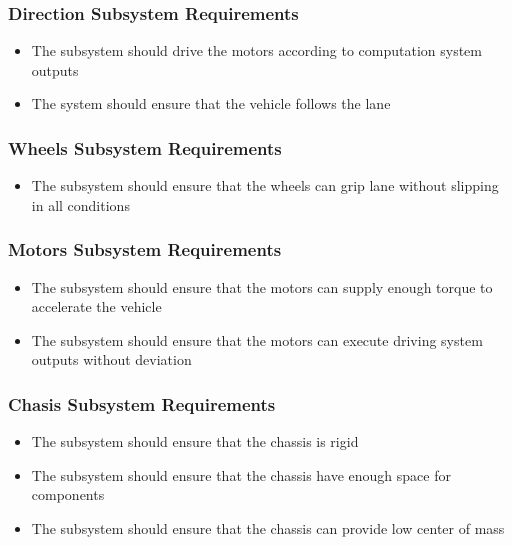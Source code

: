 \documentclass[a4paper,12pt]{article}
\begin{document}
		\subsubsection{Direction Subsystem Requirements}
	
			\begin{itemize}
				\item The subsystem should drive the motors according to computation system outputs
				\item The system should ensure that the vehicle follows the lane 
			\end{itemize}


	
	
		\subsubsection{Wheels Subsystem Requirements}	
		
			\begin{itemize}
				\item The subsystem should ensure that the wheels can grip lane without slipping in all conditions 	
			\end{itemize}
		
		\subsubsection{Motors Subsystem Requirements}
		
			\begin{itemize}
				\item The subsystem should ensure that the motors can supply enough torque to accelerate the vehicle		
				\item  The subsystem should ensure that the motors can execute driving system outputs without deviation 
			\end{itemize}
	
	
	
	
		\subsubsection{Chasis Subsystem Requirements}	
		
				\begin{itemize}
				\item The subsystem should ensure that the chassis is rigid 
				\item The subsystem should ensure that the chassis have enough space for components
				\item The subsystem should ensure that the chassis can provide low center of mass 
			\end{itemize}
		
\end{document}
